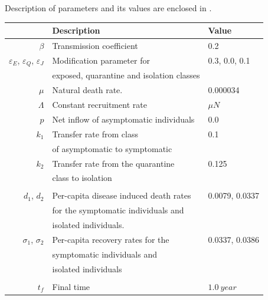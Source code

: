 Description of parameters and its values are enclosed 
in .
%
\begin{table}[htb]
    \begin{center}
      \begin{tabular}{@{}rll@{}}
        \toprule
        & \multicolumn{1}{l}{\bf{Description}}
        & \multicolumn{1}{l}{\bf{Value}}
        \\
        \midrule
        $\beta$
          & Transmission coefficient
          & \num{0.2}
        \\
        $\varepsilon_E$, 
        $\varepsilon_Q$,
        $\varepsilon_J$
          & Modification parameter for 
          & \num{0.3}, \num{0.0}, \num{0.1}
          \\
          &  exposed, quarantine and isolation classes 
          \\
        $\mu$
          & Natural death rate.
          & \num{0.000034}
        \\
        $\Lambda$
          & Constant recruitment rate
          & $\mu N$
        \\
        $p$
          & Net inflow of asymptomatic individuals
          & \num{0.0}
        \\
        $k_1$ 
          & Transfer rate from class 
          & \num{0.1}
          \\
          & of asymptomatic to symptomatic
          \\
        $k_2$
          & Transfer rate from the quarantine 
          & \num{0.125}
          \\ 
          & class to isolation
        \\
        \\
        $d_1$, $d_2$
          & Per-capita disease induced death rates 
          & \num{0.0079}, \num{0.0337}
          \\
          & for the symptomatic individuals and 
          \\
          & isolated individuals.
        \\
        $\sigma_1$, $\sigma_2$
          & Per-capita recovery rates for the 
          & \num{0.0337}, \num{0.0386}
          \\
          & symptomatic individuals and 
          \\
          &  isolated individuals
        \\
        \\
        $t_f$
          & Final time 
          & $\SI{1.0}{year}$
        \\

\end{tabular}
\end{center}
\end{table}
